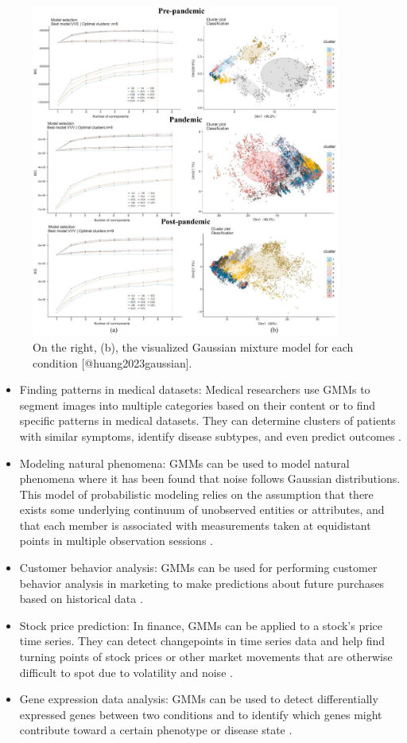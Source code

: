 \documentclass[12pt]{article}
\begin{document}
\begin{figure}[htbp] 
\centering 
\includegraphics[width=4in]{2.jpg} 
\caption{On the right, (b), the visualized Gaussian mixture model for each condition [@huang2023gaussian].}
\end{figure}

\begin{itemize}
\item
  Finding patterns in medical datasets: Medical researchers use GMMs to
  segment images into multiple categories based on their content or to
  find specific patterns in medical datasets. They can determine
  clusters of patients with similar symptoms, identify disease subtypes,
  and even predict outcomes \citep{riaz2020gaussian}.
\item
  Modeling natural phenomena: GMMs can be used to model natural
  phenomena where it has been found that noise follows Gaussian
  distributions. This model of probabilistic modeling relies on the
  assumption that there exists some underlying continuum of unobserved
  entities or attributes, and that each member is associated with
  measurements taken at equidistant points in multiple observation
  sessions \citep{xi2023deep}.
\item
  Customer behavior analysis: GMMs can be used for performing customer
  behavior analysis in marketing to make predictions about future
  purchases based on historical data \citep{melzi2017dedicated}.
\item
  Stock price prediction: In finance, GMMs can be applied to a stock's
  price time series. They can detect changepoints in time series data
  and help find turning points of stock prices or other market movements
  that are otherwise difficult to spot due to volatility and noise
  \citep{gopinathan2023stock}.
\item
  Gene expression data analysis: GMMs can be used to detect
  differentially expressed genes between two conditions and to identify
  which genes might contribute toward a certain phenotype or disease
  state \citep{mcnicholas2010model}.
\end{itemize}
\end{document}
